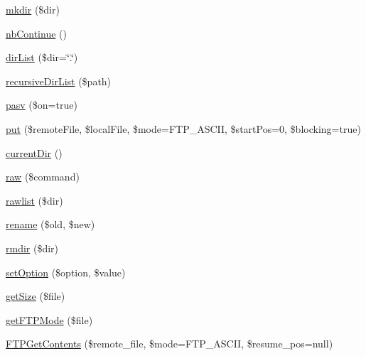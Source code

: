 \begin{DoxyCompactItemize}
\item 
\hyperlink{class_f_t_p_a955a12491968dd12e288385ceddbed71}{mkdir} (\$dir)
\item 
\hyperlink{class_f_t_p_ab15ad74313000756a987a2f12124d977}{nb\-Continue} ()
\item 
\hyperlink{class_f_t_p_a0b179fa8f07c66a2a411ad9750bcb229}{dir\-List} (\$dir=\char`\"{}.\char`\"{})
\item 
\hyperlink{class_f_t_p_a9c2f65689024dc298ce6eb475ab404a5}{recursive\-Dir\-List} (\$path)
\item 
\hyperlink{class_f_t_p_a2ead67ea4e6d7414b5f1d4ef0e8ee5cc}{pasv} (\$on=true)
\item 
\hyperlink{class_f_t_p_adc714491e971cd889acd6177f7460042}{put} (\$remote\-File, \$local\-File, \$mode=F\-T\-P\-\_\-\-A\-S\-C\-I\-I, \$start\-Pos=0, \$blocking=true)
\item 
\hyperlink{class_f_t_p_a302230a82618d22e08857cec42aa1e0f}{current\-Dir} ()
\item 
\hyperlink{class_f_t_p_abd7091cf94c937af6b17bc245a77823b}{raw} (\$command)
\item 
\hyperlink{class_f_t_p_a9079ca75d131061a995f9510eeb2deb0}{rawlist} (\$dir)
\item 
\hyperlink{class_f_t_p_a36135424173a2680ef2982c551a3268f}{rename} (\$old, \$new)
\item 
\hyperlink{class_f_t_p_a98c1931855f15470441cc48e32e78d73}{rmdir} (\$dir)
\item 
\hyperlink{class_f_t_p_a1eb6a860a7e2236618f8d800b9fad69d}{set\-Option} (\$option, \$value)
\item 
\hyperlink{class_f_t_p_ace7dab284a127ca338901fd116117d24}{get\-Size} (\$file)
\item 
\hyperlink{class_f_t_p_af90ecc3b7f3738e6e65161989c5a11be}{get\-F\-T\-P\-Mode} (\$file)
\item 
\hyperlink{class_f_t_p_a6b892d7848a0ff3fc4589081af854b1c}{F\-T\-P\-Get\-Contents} (\$remote\-\_\-file, \$mode=F\-T\-P\-\_\-\-A\-S\-C\-I\-I, \$resume\-\_\-pos=null)
\end{DoxyCompactItemize}
